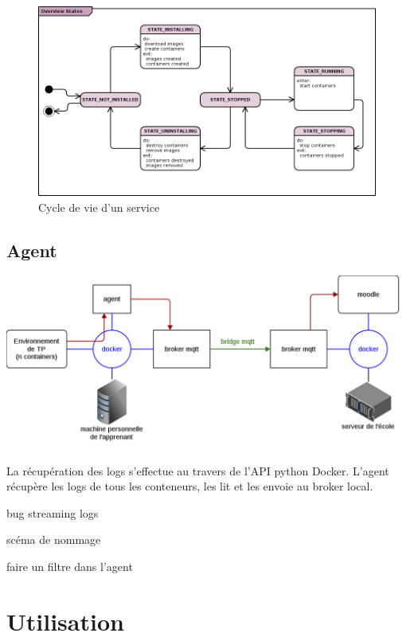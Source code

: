 \documentclass[a4paper,11pt]{report}
\begin{document}
\begin{figure}[h]
   \caption{\label{overview-states} Cycle de vie d'un service}
   \centering
   \includegraphics[width=\textwidth, keepaspectratio=true]{overview-states.png}
\end{figure}

\section{Agent}

\includegraphics[scale=0.45]{docker}

La récupération des logs s'effectue au travers de l'API python Docker\cite{docker-py}.
L'agent récupère les logs de tous les conteneurs, les lit et les envoie au broker local.

bug streaming logs

scéma de nommage


faire un filtre dans l'agent

\pagestyle{fancy}

\chapter{Utilisation}
\end{document}
